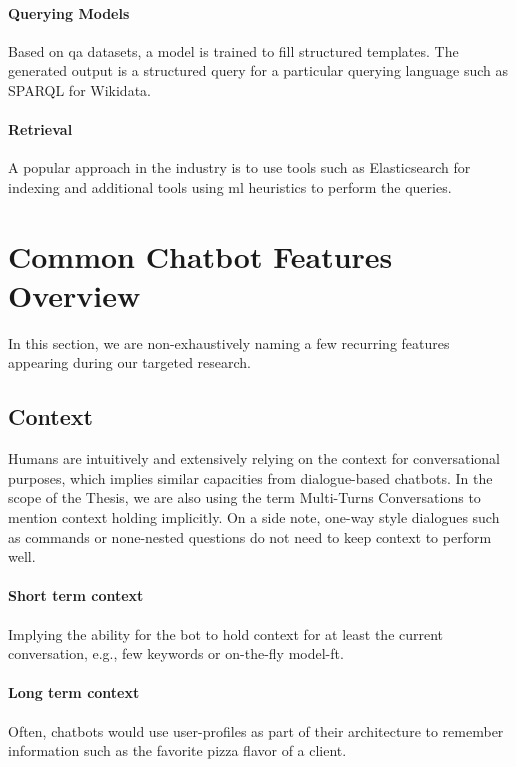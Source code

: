 \label{chatbot:templates}
\paragraph{Querying Models} Based on \gls{qa} datasets, a model is trained to fill structured templates.  The generated output is a structured query for a particular querying language such as SPARQL for Wikidata. 

\paragraph{Retrieval} A popular approach in the industry is to use tools such as Elasticsearch for indexing and additional tools using \gls{ml} heuristics to perform the queries.

\clearpage
\section{Common Chatbot Features Overview}
In this section, we are non-exhaustively naming a few recurring features appearing during our targeted research.

\subsection{Context}
\label{chatbot:context}
Humans are intuitively and extensively relying on the context for conversational purposes, which implies similar capacities from dialogue-based chatbots. In the scope of the Thesis, we are also using the term Multi-Turns Conversations to mention context holding implicitly. On a side note, one-way style dialogues such as commands or none-nested questions do not need to keep context to perform well.

\paragraph{Short term context} Implying the ability for the bot to hold context for at least the current conversation, e.g., few keywords or on-the-fly \gls{model-ft}.

\paragraph{Long term context} Often, chatbots would use user-profiles as part of their architecture to remember information such as the favorite pizza flavor of a client. 

